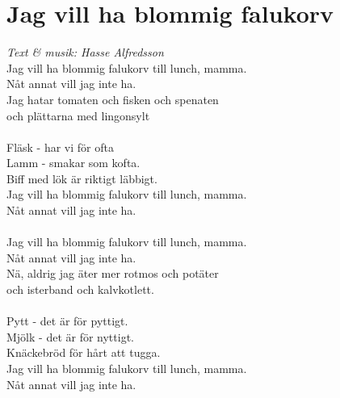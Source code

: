 \section{Jag vill ha blommig falukorv}
\textit{Text \& musik: Hasse Alfredsson}
\vspace{2mm}\\
Jag vill ha blommig falukorv till lunch, mamma.\\
Nåt annat vill jag inte ha.\\
Jag hatar tomaten och fisken och spenaten\\
och plättarna med lingonsylt\\
\\
Fläsk - har vi för ofta\\
Lamm - smakar som kofta.\\
Biff med lök är riktigt läbbigt.\\
Jag vill ha blommig falukorv till lunch, mamma.\\
Nåt annat vill jag inte ha.\\
\\
Jag vill ha blommig falukorv till lunch, mamma.\\
Nåt annat vill jag inte ha.\\
Nä, aldrig jag äter mer rotmos och potäter\\
och isterband och kalvkotlett.\\
\\
Pytt - det är för pyttigt.\\
Mjölk - det är för nyttigt.\\
Knäckebröd för hårt att tugga.\\
Jag vill ha blommig falukorv till lunch, mamma.\\
Nåt annat vill jag inte ha.

